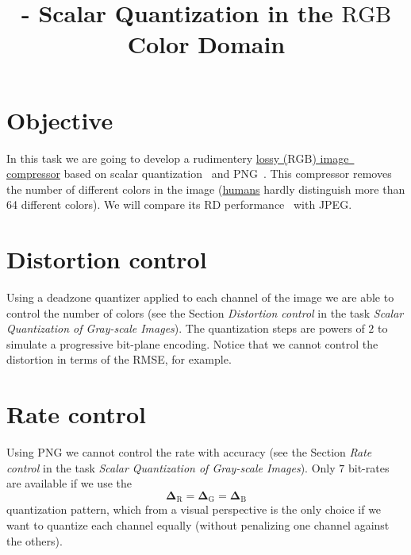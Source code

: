 

\title{\SM{} - Scalar Quantization in the $\text{RGB}$ Color Domain}

\maketitle

\tableofcontents

\section{Objective}
In this task we are going to develop a rudimentery
\href{https://en.wikipedia.org/wiki/Lossy_compression}{lossy
  ($\text{RGB}$) image~\cite{vruiz__image_IO} compressor} based on
scalar quantization~\cite{vruiz__scalar_quantization} and
PNG~\cite{vruiz__PNG}. This compressor removes the number of different
colors in the image
(\href{https://en.wikipedia.org/wiki/Visual_system}{humans} hardly
distinguish more than 64 different colors). We will compare its
RD performance~\cite{vruiz__information_theory} with JPEG.

\section{Distortion control}
Using a deadzone quantizer applied to each channel of the image we are
able to control the number of colors (see the Section
\emph{Distortion control} in the task \emph{Scalar Quantization of
Gray-scale Images}). The quantization steps are
powers of $2$ to simulate a progressive bit-plane encoding.  Notice
that we cannot control the distortion in terms of the RMSE, for
example.

\section{Rate control}
Using PNG we cannot control the rate with accuracy (see the Section
\emph{Rate control} in the task \emph{Scalar Quantization of
Gray-scale Images}). Only $7$ bit-rates are available if we use the
\begin{equation}
  \mathbf{\Delta}_{\text{R}} = \mathbf{\Delta}_{\text{G}} = \mathbf{\Delta}_{\text{B}}
  \label{eq:simple_Q}
\end{equation}
quantization pattern, which from a visual perspective is the only choice if we want to quantize each channel equally (without penalizing one channel against the others).

